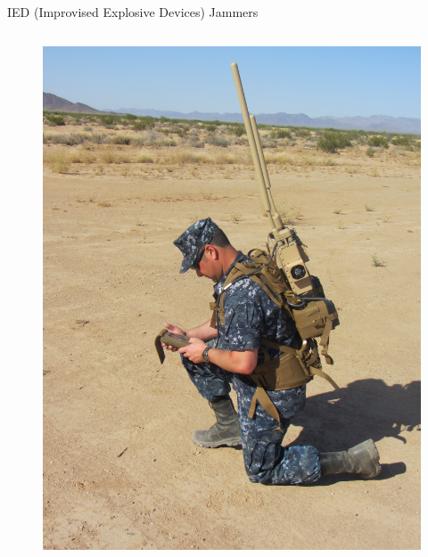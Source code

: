 \begin{frame}{IED (Improvised Explosive Devices) Jammers}
\begin{columns}[c, onlytextwidth]
\begin{column}{0.45\textwidth}
            \begin{figure}
                \centering
                \includegraphics[width=\textwidth]{img/IED-jammers.jpg}
            \end{figure}

        \end{column}

    \end{columns}

\end{frame}



